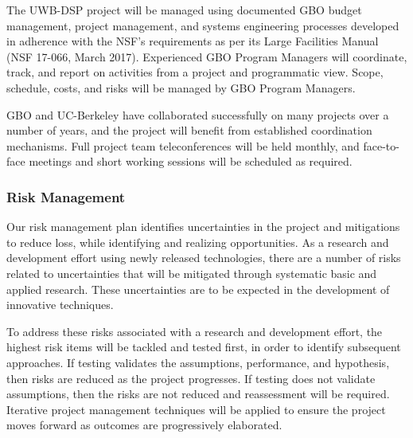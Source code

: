 \documentclass[10pt]{myNSF}
\begin{document}
\label{sec:organization}

The UWB-DSP project will be managed using documented GBO budget
management, project management, and systems engineering processes
developed in adherence with the NSF’s requirements as per its Large
Facilities Manual (NSF 17-066, March 2017). Experienced GBO Program
Managers will coordinate, track, and report on activities from a
project and programmatic view. Scope, schedule, costs, and risks will
be managed by GBO Program Managers.

GBO and UC-Berkeley have collaborated successfully on many projects
over a number of years, and the project will benefit from established
coordination mechanisms. Full project team teleconferences will be
held monthly, and face-to-face meetings and short working sessions
will be scheduled as required.

\subsubsection{Risk Management}
\label{sec:risk_management}

Our risk management plan identifies uncertainties in the project and
mitigations to reduce loss, while identifying and realizing
opportunities. As a research and development effort using newly
released technologies, there are a number of risks related to
uncertainties that will be mitigated through systematic basic and
applied research. These uncertainties are to be expected in the
development of innovative techniques.

To address these risks associated with a research and development
effort, the highest risk items will be tackled and tested first, in
order to identify subsequent approaches. If testing validates the
assumptions, performance, and hypothesis, then risks are reduced as
the project progresses. If testing does not validate assumptions, then
the risks are not reduced and reassessment will be required. Iterative
project management techniques will be applied to ensure the project
moves forward as outcomes are progressively elaborated.
\end{document}
